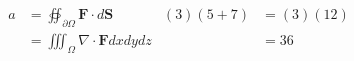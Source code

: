 \begin{block}
  \begin{align}
    a &= \oiint_{\partial\Omega}\mathbf{F}\cdot
         d\mathbf{S}  &  (3)(5 + 7) &= (3)(12)\\
      &= \iiint_\Omega\nabla\cdot\mathbf{F}dxdydz
         &  &= 36
  \end{align}
\end{block}
